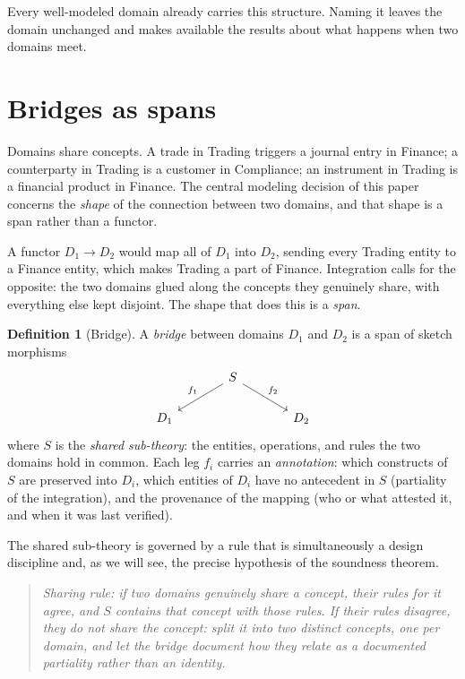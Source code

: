 \documentclass[11pt]{article}
\theoremstyle{plain}
\theoremstyle{definition}
\newtheorem{definition}{Definition}
\begin{document}
Every well-modeled domain already carries this structure. Naming it leaves the domain unchanged and makes available the results about what happens when two domains meet.

\section{Bridges as spans}\label{sec:bridges}

Domains share concepts. A trade in Trading triggers a journal entry in Finance; a counterparty in Trading is a customer in Compliance; an instrument in Trading is a financial product in Finance. The central modeling decision of this paper concerns the \emph{shape} of the connection between two domains, and that shape is a span rather than a functor.

A functor $D_1 \to D_2$ would map all of $D_1$ into $D_2$, sending every Trading entity to a Finance entity, which makes Trading a part of Finance. Integration calls for the opposite: the two domains glued along the concepts they genuinely share, with everything else kept disjoint. The shape that does this is a \emph{span}.

\begin{definition}[Bridge]\label{def:bridge}
A \emph{bridge} between domains $D_1$ and $D_2$ is a span of sketch morphisms
\[
\begin{tikzcd}[column sep=large]
 & S \arrow[dl,"f_1"'] \arrow[dr,"f_2"] & \\
D_1 & & D_2
\end{tikzcd}
\]
where $S$ is the \emph{shared sub-theory}: the entities, operations, and rules the two domains hold in common. Each leg $f_i$ carries an \emph{annotation}: which constructs of $S$ are preserved into $D_i$, which entities of $D_i$ have no antecedent in $S$ (partiality of the integration), and the provenance of the mapping (who or what attested it, and when it was last verified).
\end{definition}

The shared sub-theory is governed by a rule that is simultaneously a design discipline and, as we will see, the precise hypothesis of the soundness theorem.

\begin{quote}\itshape
Sharing rule: if two domains genuinely share a concept, their rules for it agree, and $S$ contains that concept with those rules. If their rules disagree, they do not share the concept: split it into two distinct concepts, one per domain, and let the bridge document how they relate as a documented partiality rather than an identity.
\end{quote}
\end{document}
